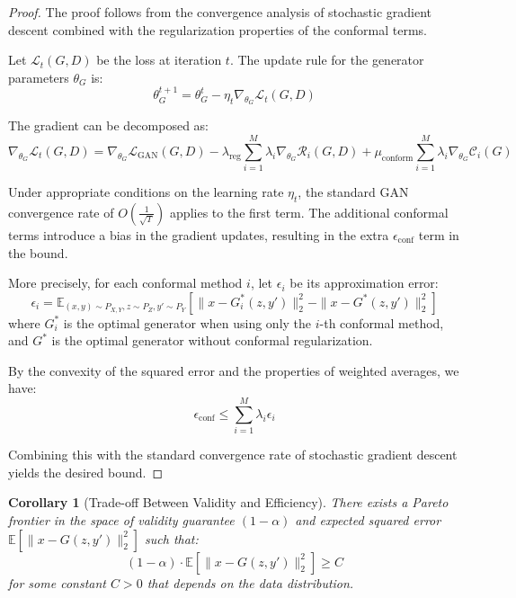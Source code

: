 \documentclass{article}
\theoremstyle{plain}
\newtheorem{corollary}[theorem]{Corollary}
\theoremstyle{definition}
\theoremstyle{remark}
\begin{document}
\begin{proof}
The proof follows from the convergence analysis of stochastic gradient descent combined with the regularization properties of the conformal terms.

Let $\mathcal{L}_t(G, D)$ be the loss at iteration $t$. The update rule for the generator parameters $\theta_G$ is:
\begin{equation}
\theta_G^{t+1} = \theta_G^t - \eta_t \nabla_{\theta_G} \mathcal{L}_t(G, D)
\end{equation}

The gradient can be decomposed as:
\begin{equation}
\nabla_{\theta_G} \mathcal{L}_t(G, D) = \nabla_{\theta_G} \mathcal{L}_{\text{GAN}}(G, D) - \lambda_{\text{reg}} \sum_{i=1}^M \lambda_i \nabla_{\theta_G} \mathcal{R}_i(G, D) + \mu_{\text{conform}} \sum_{i=1}^M \lambda_i \nabla_{\theta_G} \mathcal{C}_i(G)
\end{equation}

Under appropriate conditions on the learning rate $\eta_t$, the standard GAN convergence rate of $O\left(\frac{1}{\sqrt{T}}\right)$ applies to the first term. The additional conformal terms introduce a bias in the gradient updates, resulting in the extra $\epsilon_{\text{conf}}$ term in the bound.

More precisely, for each conformal method $i$, let $\epsilon_i$ be its approximation error:
\begin{equation}
\epsilon_i = \mathbb{E}_{(x,y) \sim P_{X,Y}, z \sim P_Z, y' \sim P_Y}\left[\|x - G_i^*(z, y')\|_2^2 - \|x - G^*(z, y')\|_2^2\right]
\end{equation}
where $G_i^*$ is the optimal generator when using only the $i$-th conformal method, and $G^*$ is the optimal generator without conformal regularization.

By the convexity of the squared error and the properties of weighted averages, we have:
\begin{equation}
\epsilon_{\text{conf}} \leq \sum_{i=1}^M \lambda_i \epsilon_i
\end{equation}

Combining this with the standard convergence rate of stochastic gradient descent yields the desired bound.
\end{proof}

\begin{corollary}[Trade-off Between Validity and Efficiency]
There exists a Pareto frontier in the space of validity guarantee $(1-\alpha)$ and expected squared error $\mathbb{E}\left[\|x - G(z, y')\|_2^2\right]$ such that:
\begin{equation}
(1-\alpha) \cdot \mathbb{E}\left[\|x - G(z, y')\|_2^2\right] \geq C
\end{equation}
for some constant $C > 0$ that depends on the data distribution.
\end{corollary}
\end{document}
